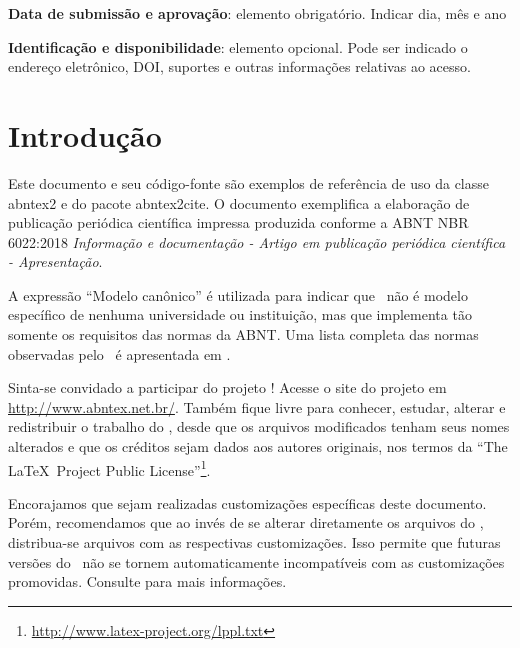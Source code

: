 \documentclass[
article,			%
11pt,				%
oneside,			%
a4paper,			%
english,			%
brazil,				%
sumario=tradicional
]{abntex2}
\begin{document}
	
	\begin{center}\smaller
		\textbf{Data de submissão e aprovação}: elemento obrigatório. Indicar dia, mês e ano
		
		\textbf{Identificação e disponibilidade}: elemento opcional. Pode ser indicado 
		o endereço eletrônico, DOI, suportes e outras informações relativas ao acesso.
	\end{center}
	
	\textual
	
	\section{Introdução}
	
	Este documento e seu código-fonte são exemplos de referência de uso da classe
	\textsf{abntex2} e do pacote \textsf{abntex2cite}. O documento exemplifica a
	elaboração de publicação periódica científica impressa produzida conforme a ABNT
	NBR 6022:2018 \emph{Informação e documentação - Artigo em publicação periódica
		científica - Apresentação}.
	
	A expressão ``Modelo canônico'' é utilizada para indicar que \abnTeX\ não é
	modelo específico de nenhuma universidade ou instituição, mas que implementa tão
	somente os requisitos das normas da ABNT. Uma lista completa das normas
	observadas pelo \abnTeX\ é apresentada em .
	
	Sinta-se convidado a participar do projeto \abnTeX! Acesse o site do projeto em
	\url{http://www.abntex.net.br/}. Também fique livre para conhecer,
	estudar, alterar e redistribuir o trabalho do \abnTeX, desde que os arquivos
	modificados tenham seus nomes alterados e que os créditos sejam dados aos
	autores originais, nos termos da ``The \LaTeX\ Project Public
	License''\footnote{\url{http://www.latex-project.org/lppl.txt}}.
	
	Encorajamos que sejam realizadas customizações específicas deste documento.
	Porém, recomendamos que ao invés de se alterar diretamente os arquivos do
	\abnTeX, distribua-se arquivos com as respectivas customizações. Isso permite
	que futuras versões do \abnTeX~não se tornem automaticamente incompatíveis com
	as customizações promovidas. Consulte 
	para mais informações.
	
\end{document}
